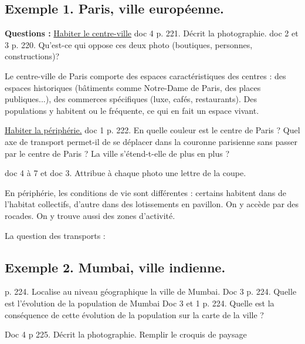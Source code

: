 \documentclass{beamer}
\begin{document}
\subsection{Exemple 1. Paris, ville européenne.}

\begin{frame}
\textbf{Questions : }
\underline{Habiter le centre-ville}
doc 4 p. 221. Décrit la photographie.
doc 2 et 3 p. 220. Qu'est-ce qui oppose ces deux photo (boutiques, personnes, constructions)?
\end{frame}

\begin{frame}
Le centre-ville de Paris comporte des espaces caractéristiques des centres : des espaces historiques (bâtiments comme Notre-Dame de Paris, des places publiques...), des commerces spécifiques (luxe, cafés, restaurants). Des populations y habitent ou le fréquente, ce qui en fait un espace vivant.
\end{frame}

\begin{frame}
\underline{Habiter la périphérie.}
doc 1 p. 222.
En quelle couleur est le centre de Paris ?
Quel axe de transport permet-il de se déplacer dans la couronne parisienne sans passer par le centre de Paris ?
La ville s'étend-t-elle de plus en plus ?

doc 4 à 7 et doc 3. Attribue à chaque photo une lettre de la coupe.
\end{frame}


\begin{frame}

En périphérie, les conditions de vie sont différentes : certains habitent dans de l'habitat collectifs, d'autre dans des lotissements en pavillon. On y accède par des rocades. On y trouve aussi des zones d'activité.

\end{frame}


La question des transports : 

\subsection{Exemple 2. Mumbai, ville indienne.}

p. 224. Localise au niveau géographique la ville de Mumbai.
Doc 3 p. 224. Quelle est l'évolution de la population de Mumbai
Doc 3 et 1 p. 224. Quelle est la conséquence de cette évolution de la population sur la carte de la ville ?

Doc 4 p 225. Décrit la photographie.
Remplir le croquis de paysage
\end{document}
